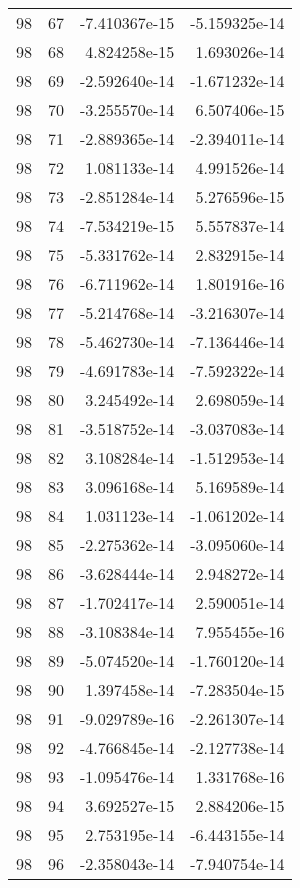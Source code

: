 \begin{tabular}{rrrr}
  98 &   67 & -7.410367e-15 & -5.159325e-14 \\
  98 &   68 &  4.824258e-15 &  1.693026e-14 \\
  98 &   69 & -2.592640e-14 & -1.671232e-14 \\
  98 &   70 & -3.255570e-14 &  6.507406e-15 \\
  98 &   71 & -2.889365e-14 & -2.394011e-14 \\
  98 &   72 &  1.081133e-14 &  4.991526e-14 \\
  98 &   73 & -2.851284e-14 &  5.276596e-15 \\
  98 &   74 & -7.534219e-15 &  5.557837e-14 \\
  98 &   75 & -5.331762e-14 &  2.832915e-14 \\
  98 &   76 & -6.711962e-14 &  1.801916e-16 \\
  98 &   77 & -5.214768e-14 & -3.216307e-14 \\
  98 &   78 & -5.462730e-14 & -7.136446e-14 \\
  98 &   79 & -4.691783e-14 & -7.592322e-14 \\
  98 &   80 &  3.245492e-14 &  2.698059e-14 \\
  98 &   81 & -3.518752e-14 & -3.037083e-14 \\
  98 &   82 &  3.108284e-14 & -1.512953e-14 \\
  98 &   83 &  3.096168e-14 &  5.169589e-14 \\
  98 &   84 &  1.031123e-14 & -1.061202e-14 \\
  98 &   85 & -2.275362e-14 & -3.095060e-14 \\
  98 &   86 & -3.628444e-14 &  2.948272e-14 \\
  98 &   87 & -1.702417e-14 &  2.590051e-14 \\
  98 &   88 & -3.108384e-14 &  7.955455e-16 \\
  98 &   89 & -5.074520e-14 & -1.760120e-14 \\
  98 &   90 &  1.397458e-14 & -7.283504e-15 \\
  98 &   91 & -9.029789e-16 & -2.261307e-14 \\
  98 &   92 & -4.766845e-14 & -2.127738e-14 \\
  98 &   93 & -1.095476e-14 &  1.331768e-16 \\
  98 &   94 &  3.692527e-15 &  2.884206e-15 \\
  98 &   95 &  2.753195e-14 & -6.443155e-14 \\
  98 &   96 & -2.358043e-14 & -7.940754e-14 \\

\end{tabular}
